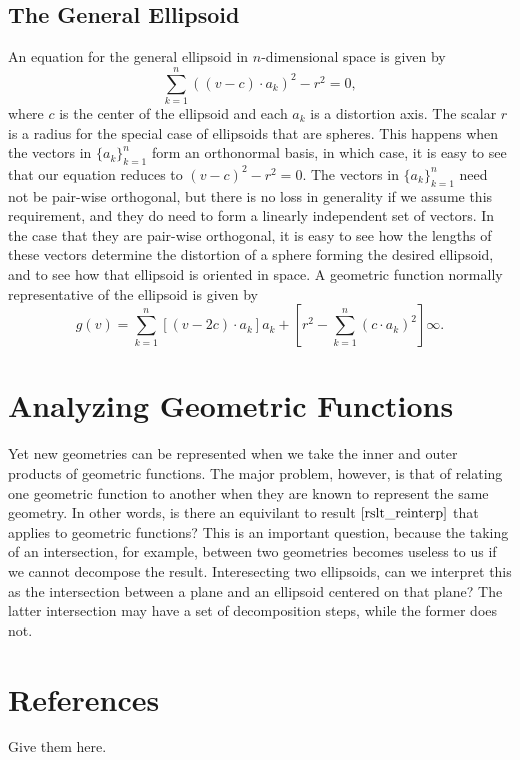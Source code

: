 \documentclass{article}
\newcommand{\nvai}{\infty}
\begin{document}
\subsection{The General Ellipsoid}

An equation for the general ellipsoid in $n$-dimensional space is given by
\begin{equation*}
\sum_{k=1}^n((v-c)\cdot a_k)^2 - r^2 = 0,
\end{equation*}
where $c$ is the center of the ellipsoid and each $a_k$ is a
distortion axis.  The scalar $r$ is a radius for the special case of ellipsoids that
are spheres.  This happens when the vectors in $\{a_k\}_{k=1}^n$ form an orthonormal
basis, in which case, it is easy to see that our equation reduces to $(v-c)^2-r^2=0$.
The vectors in $\{a_k\}_{k=1}^n$ need not be pair-wise orthogonal, but there is no
loss in generality if we assume this requirement, and they do need to form a linearly
independent set of vectors.  In the case that they are pair-wise orthogonal,
it is easy to see how the lengths of these vectors
determine the distortion of a sphere forming the desired ellipsoid, and to see
how that ellipsoid is oriented in space.
A geometric function normally representative of the ellipsoid is given by
\begin{equation*}
g(v) = \sum_{k=1}^n[(v-2c)\cdot a_k]a_k + \left[r^2-\sum_{k=1}^n(c\cdot a_k)^2\right]\nvai.
\end{equation*}

\section{Analyzing Geometric Functions}

Yet new geometries can be represented when we take the inner and outer
products of geometric functions.  The major problem, however, is that of
relating one geometric function to another when they are known to represent
the same geometry.  In other words, is there an equivilant to result
$\eqref{rslt_reinterp}$ that applies to geometric functions?  This is an
important question, because the taking of an intersection, for example,
between two geometries becomes useless to us if we cannot decompose the result.
Interesecting two ellipsoids, can we interpret this as the intersection between
a plane and an ellipsoid centered on that plane?  The latter intersection may
have a set of decomposition steps, while the former does not.

\section{References}

Give them here.
\end{document}
